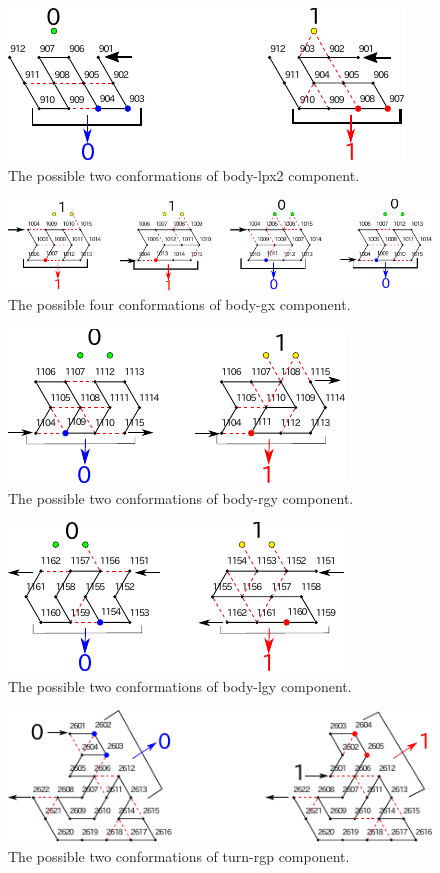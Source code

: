 \begin{figure}[h]
\centering
\includegraphics[width=0.55\linewidth]{pic/body-lpx2.pdf}
\caption{The possible two conformations of body-lpx2 component.}
\label{fig:body-lpx2}
\end{figure}

\begin{figure}[h]
\centering
\includegraphics[width=\linewidth]{pic/body-gx.pdf}
\caption{The possible four conformations of body-gx component.}
\label{fig:body-gx}
\end{figure}

\begin{figure}[h]
\centering
\includegraphics[width=0.5\linewidth]{pic/body-rgy.pdf}
\caption{The possible two conformations of body-rgy component.}
\label{fig:body-rgy}
\end{figure}

\begin{figure}[h]
\centering
\includegraphics[width=0.5\linewidth]{pic/body-lgy.pdf}
\caption{The possible two conformations of body-lgy component.}
\label{fig:body-lgy}
\end{figure}

\begin{figure}[h]
\centering
\includegraphics[width=0.7\linewidth]{pic/turn-rgp.pdf}
\caption{The possible two conformations of turn-rgp component.}
\label{fig:turn-rgp}
\end{figure}

